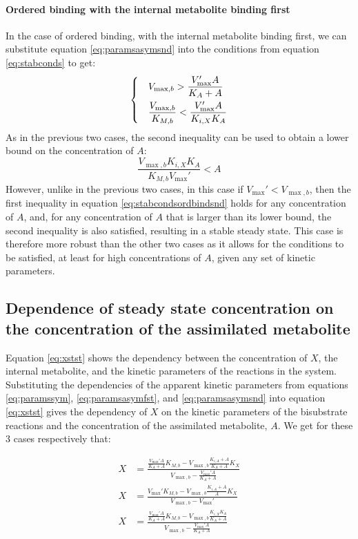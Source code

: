   \paragraph{Ordered binding with the internal metabolite binding first}
  In the case of ordered binding, with the internal metabolite binding first, we can substitute equation \ref{eq:paramsasymsnd} into the conditions from equation \ref{eq:stabconds} to get:
  \begin{equation}
    \label{eq:stabcondsordbindsnd}
    \begin{dcases}
      & V_{\max,b}>\frac{V_{\max}'A}{K_A+A} \\
      & \frac{V_{\max,b}}{K_{M,b}}<\frac{V_{\max}'A}{K_{i,X}K_A}
    \end{dcases}
  \end{equation}
  As in the previous two cases, the second inequality can be used to obtain a lower bound on the concentration of $A$:
  \begin{equation*}
    \frac{V_{\max,b}K_{i,X}K_A}{K_{M,b}V_{\max}'}<A
  \end{equation*}
  However, unlike in the previous two cases, in this case if $V_{\max}'<V_{\max,b}$, then the first inequality in equation \ref{eq:stabcondsordbindsnd} holds for any concentration of $A$, and, for any concentration of $A$ that is larger than its lower bound, the second inequality is also satisfied, resulting in a stable steady state.
  This case is therefore more robust than the other two cases as it allows for the conditions to be satisfied, at least for high concentrations of $A$, given any set of kinetic parameters.
  \subsection{Dependence of steady state concentration on the concentration of the assimilated metabolite}
  Equation \ref{eq:xstst} shows the dependency between the concentration of $X$, the internal metabolite, and the kinetic parameters of the reactions in the system.
  Substituting the dependencies of the apparent kinetic parameters from equations \ref{eq:paramssym}, \ref{eq:paramsasymfst}, and \ref{eq:paramsasymsnd} into equation \ref{eq:xstst} gives the dependency of $X$ on the kinetic parameters of the bisubstrate reactions and the concentration of the assimilated metabolite, $A$.
  We get for these 3 cases respectively that:

  \begin{align}
      X &= \frac{\frac{V_{\max}'A}{K_A+A}K_{M,b}-V_{\max,b}\frac{K_{i,A}+A}{K_A+A}K_X}
      {V_{\max,b}-\frac{V_{\max}'A}{K_A+A}} \\
      X &= \frac{V_{\max}'K_{M,b}-V_{\max,b}\frac{K_{i,A}+A}{A}K_X}
      {V_{\max,b}-V_{\max}'} \\
      X &= \frac{\frac{V_{\max}'A}{K_A+A}K_{M,b}-V_{\max,b}\frac{K_{i,X}K_A}{K_A+A} }
      { V_{\max,b}-\frac{V_{\max}'A}{K_A+A} }
  \end{align}

